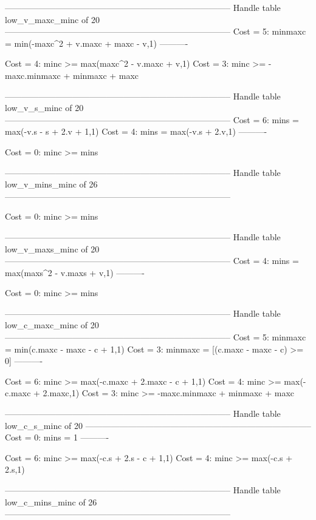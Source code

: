--------------------------------------------------------------------------------
Handle table low_v_maxc_minc of 20
--------------------------------------------------------------------------------
Cost =  5:  minmaxc = min(-maxc^2 + v.maxc + maxc - v,1)
----------

Cost =  4:  minc >= max(maxc^2 - v.maxc + v,1)
Cost =  3:  minc >= -maxc.minmaxc + minmaxc + maxc

--------------------------------------------------------------------------------
Handle table low_v_s_minc of 20
--------------------------------------------------------------------------------
Cost =  6:  mins = max(-v.s - s + 2.v + 1,1)
Cost =  4:  mins = max(-v.s + 2.v,1)
----------

Cost =  0:  minc >= mins

--------------------------------------------------------------------------------
Handle table low_v_mins_minc of 26
--------------------------------------------------------------------------------

Cost =  0:  minc >= mins

--------------------------------------------------------------------------------
Handle table low_v_maxs_minc of 20
--------------------------------------------------------------------------------
Cost =  4:  mins = max(maxs^2 - v.maxs + v,1)
----------

Cost =  0:  minc >= mins

--------------------------------------------------------------------------------
Handle table low_c_maxc_minc of 20
--------------------------------------------------------------------------------
Cost =  5:  minmaxc = min(c.maxc - maxc - c + 1,1)
Cost =  3:  minmaxc = [(c.maxc - maxc - c) >= 0]
----------

Cost =  6:  minc >= max(-c.maxc + 2.maxc - c + 1,1)
Cost =  4:  minc >= max(-c.maxc + 2.maxc,1)
Cost =  3:  minc >= -maxc.minmaxc + minmaxc + maxc

--------------------------------------------------------------------------------
Handle table low_c_s_minc of 20
--------------------------------------------------------------------------------
Cost =  0:  mins = 1
----------

Cost =  6:  minc >= max(-c.s + 2.s - c + 1,1)
Cost =  4:  minc >= max(-c.s + 2.s,1)

--------------------------------------------------------------------------------
Handle table low_c_mins_minc of 26
--------------------------------------------------------------------------------

